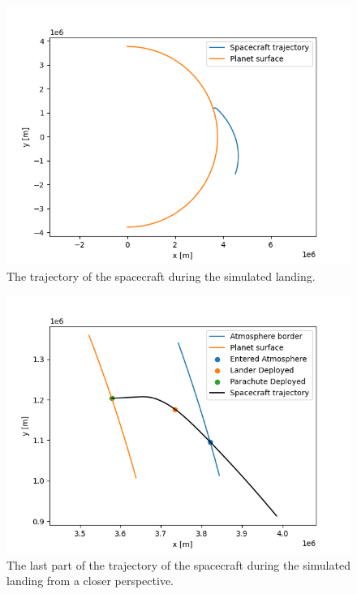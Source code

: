 \documentclass[reprint,english,notitlepage]{revtex4-2}
\begin{document}
\begin{figure}[h]
    \centering
    \includegraphics[scale=0.4]{Figures/sim_landing_far}
    \caption{The trajectory of the spacecraft during the simulated landing.}\label{fig:sim_landing_far}
\end{figure}

\begin{figure}[h]
    \centering
    \includegraphics[scale=0.4]{Figures/sim_landing_close}
    \caption{The last part of the trajectory of the spacecraft during the simulated landing from a closer perspective.}\label{fig:sim_landing_close}
\end{figure}
\end{document}

